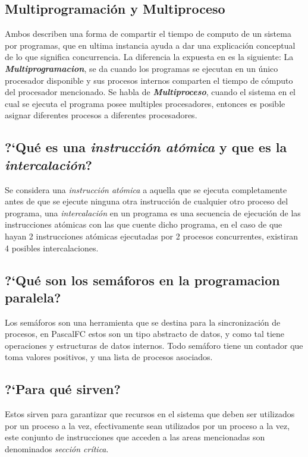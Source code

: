 \documentclass{article}
\begin{document}
\subsection{Multiprogramaci\'on y Multiproceso}
Ambos describen una forma de compartir el tiempo de computo de un sistema por programas, que en ultima instancia ayuda a dar una explicaci\'on conceptual de lo que significa concurrencia. La diferencia la expuesta en \cite{gortazarbellas} es la siguiente:
La \textbf{\textit{Multiprogramacion}}, se da cuando los programas se ejecutan en un \'unico procesador disponible y sus procesos internos comparten el tiempo de c\'omputo del procesador mencionado. Se habla de \textbf{\textit{Multiproceso}}, cuando el sistema en el cual se ejecuta el programa posee multiples procesadores, entonces es posible asignar diferentes procesos a diferentes procesadores.

\subsection{?`Qu\'e es una \textit{instrucci\'on at\'omica} y que es la \textit{intercalaci\'on}?}
\label{sub:atomicaintercalacion}
Se considera una \textit{instrucci\'on at\'omica} \cite{gortazarbellas} a aquella que se ejecuta completamente antes de que se ejecute ninguna otra instrucci\'on de cualquier otro proceso del programa, una \textit{intercalaci\'on} en un programa es una secuencia de ejecuci\'on de las instrucciones at\'omicas con las que cuente dicho programa, en el caso de que hayan 2 instrucciones at\'omicas ejecutadas por 2 procesos concurrentes, existiran 4 posibles intercalaciones.

\subsection{?`Qu\'e son los sem\'aforos en la programacion paralela?}
Los sem\'aforos son una herramienta que se destina para la sincronizaci\'on de procesos, en PascalFC estos son un tipo abstracto de datos, y como tal tiene operaciones y estructuras de datos internos. Todo sem\'aforo tiene un contador que toma valores positivos, y una lista de procesos asociados.
\subsection{?`Para qu\'e sirven?}
Estos sirven para garantizar que recursos en el sistema que deben ser utilizados por un proceso a la vez, efectivamente sean utilizados por un proceso a la vez, este conjunto de instrucciones que acceden a las areas mencionadas son denominados \textit{secci\'on cr\'itica}.
\end{document}
